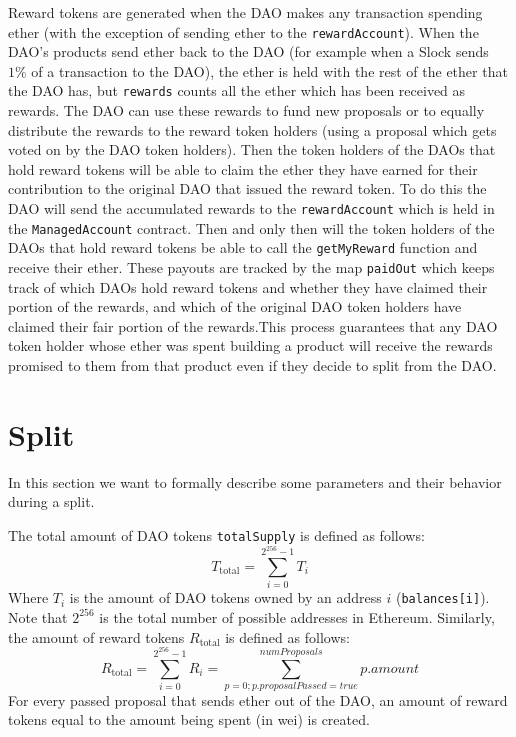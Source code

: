 \documentclass[9pt,oneside]{amsart}
\begin{document}
\begin{multicols}{2}
Reward tokens are generated when the DAO makes any transaction spending ether (with the exception of sending ether to the \verb|rewardAccount|). When the DAO’s products send ether back to the DAO (for example when a Slock sends $1\%$ of a transaction to the DAO), the ether is held with the rest of the ether that the DAO has, but \verb|rewards| counts all the ether which has been received as rewards. The DAO can use these rewards to fund new proposals or to equally distribute the rewards to the reward token holders (using a proposal which gets voted on by the DAO token holders). Then the token holders of the DAOs that hold reward tokens will be able to claim the ether they have earned for their contribution to the original DAO that issued the reward token. To do this the DAO will send the accumulated rewards to the \verb|rewardAccount| which is held in the \verb|ManagedAccount| contract. Then and only then will the token holders of the DAOs that hold reward tokens be able to call the \verb|getMyReward| function and receive their ether. These payouts are tracked by the map \verb|paidOut| which keeps track of which DAOs hold reward tokens and whether they have claimed their portion of the rewards, and which of the original DAO token holders have claimed their fair portion of the rewards.This process guarantees that any DAO token holder whose ether was spent building a product will receive the rewards promised to them from that product even if they decide to split from the DAO.  

\section{Split} \label{split}

In this section we want to formally describe some parameters and their behavior during a split.

The total amount of DAO tokens \verb|totalSupply| is defined as follows:
\begin{equation}
T_{\text{total}} = \sum_{i=0}^{2^{256}-1} T_i
\end{equation}
Where $T_i$ is the amount of DAO tokens owned by an address $i$ (\verb|balances[i]|). Note that  $2^{256}$ is the total number of possible addresses in Ethereum.
Similarly, the amount of reward tokens $R_{\text{total}}$ is defined as follows:
\begin{equation}
 R_{\text{total}} = \sum_{i=0}^{2^{256}-1} R_i = \sum_{p=0; p.proposalPassed = true}^{numProposals} p.amount
\end{equation}
For every passed proposal that sends ether out of the DAO, an amount of reward tokens equal to the amount being spent (in wei) is created.



\end{multicols}
\end{document}
